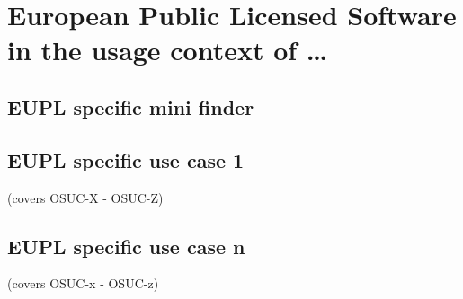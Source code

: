 %
%
%
%
%



\section{European Public Licensed Software in the usage context of \ldots}
\label{OSUC-01-EUPL} \label{OSUC-03-EUPL} 
\label{OSUC-06-EUPL} \label{OSUC-09-EUPL}

\label{OSUC-02-EUPL} \label{OSUC-04-EUPL} \label{OSUC-05-EUPL}
\label{OSUC-07-EUPL} \label{OSUC-08-EUPL} \label{OSUC-10-EUPL}

\subsection{EUPL specific mini finder}

\subsection{EUPL specific use case 1}
(covers OSUC-X - OSUC-Z)

\subsection{EUPL specific use case n}
(covers OSUC-x - OSUC-z)


%
